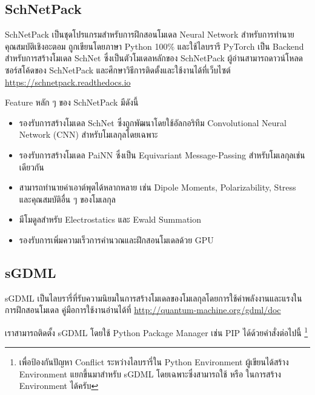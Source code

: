 \subsection{SchNetPack}
\label{ssec:lib_schnetpack}

SchNetPack เป็นชุดโปรแกรมสำหรับการฝึกสอนโมเดล Neural Network สำหรับการทำนายคุณสมบัติเชิงอะตอม\autocite{schutt2019}
ถูกเขียนโดยภาษา Python 100\% และใช้ไลบรารี PyTorch เป็น Backend สำหรับการสร้างโมเดล SchNet ซึ่งเป็นตัวโมเดลหลักของ SchNetPack
ผู้อ่านสามารถดาวน์โหลดซอร์สโค้ดของ SchNetPack และศึกษาวิธีการติดตั้งและใช้งานได้ที่เว็บไซต์ \url{https://schnetpack.readthedocs.io}

\noindent Feature หลัก ๆ ของ SchNetPack มีดังนี้

\begin{itemize}
    \item รองรับการสร้างโมเดล SchNet ซึ่งถูกพัฒนาโดยใช้อัลกอริทึม Convolutional Neural Network (CNN) สำหรับโมเลกุลโดยเฉพาะ%
    \autocite{schutt2017,schutt2017a}
    
    \item รองรับการสร้างโมเดล PaiNN ซึ่งเป็น Equivariant Message-Passing สำหรับโมเลกุลเช่นเดียวกัน\autocite{schutt2021}
    
    \item สามารถทำนายค่าเอาต์พุตได้หลากหลาย เช่น Dipole Moments, Polarizability, Stress และคุณสมบัติอื่น ๆ ของโมเลกุล
    
    \item มีโมดูลสำหรับ Electrostatics และ Ewald Summation
    
    \item รองรับการเพิ่มความเร็วการคำนวณและฝึกสอนโมเดลด้วย GPU
\end{itemize}

\subsection{sGDML}
\label{ssec:lib_sgdml}

sGDML เป็นไลบรารี่ที่รับความนิยมในการสร้างโมเดลของโมเลกุลโดยการใช้ค่าพลังงานและแรงในการฝึกสอนโมเดล\autocite{chmiela2019}
คู่มือการใช้งานอ่านได้ที่ \url{http://quantum-machine.org/gdml/doc}

\noindent เราสามารถติดตั้ง sGDML โดยใช้ Python Package Manager เช่น PIP ได้ด้วยคำสั่งต่อไปนี้%
\footnote{เพื่อป้องกันปัญหา Conflict ระหว่างไลบรารี่ใน Python Environment ผู้เขียนได้สร้าง Environment แยกขึ้นมาสำหรับ sGDML 
โดยเฉพาะซึ่งสามารถใช้  หรือ  ในการสร้าง Environment ได้ครับ}

